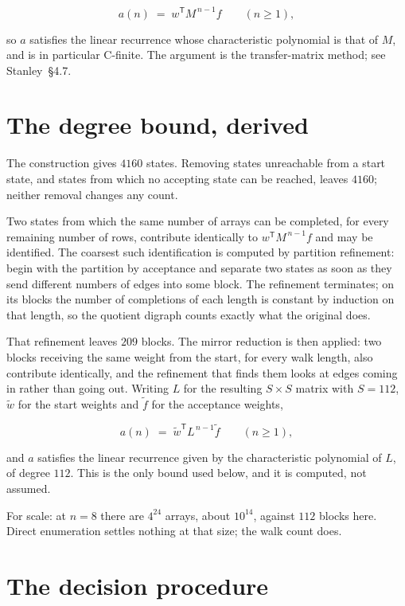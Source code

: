 \documentclass[11pt]{article}
\theoremstyle{definition}
\begin{document}
\[a(n) \;=\; w^{\mathsf T} M^{\,n-1} f \qquad (n \ge 1),\]

so $a$ satisfies the linear recurrence whose characteristic polynomial is that of $M$, and is in particular C-finite. The argument is the transfer-matrix method; see Stanley~\S4.7.

\section{The degree bound, derived}

The construction gives $4160$ states. Removing states unreachable from a start state, and states from which no accepting state can be reached, leaves $4160$; neither removal changes any count.

Two states from which the same number of arrays can be completed, for every remaining number of rows, contribute identically to $w^{\mathsf T}M^{\,n-1}f$ and may be identified. The coarsest such identification is computed by partition refinement: begin with the partition by acceptance and separate two states as soon as they send different numbers of edges into some block. The refinement terminates; on its blocks the number of completions of each length is constant by induction on that length, so the quotient digraph counts exactly what the original does.

That refinement leaves $209$ blocks. The mirror reduction is then applied: two blocks receiving the same weight from the start, for every walk length, also contribute identically, and the refinement that finds them looks at edges coming in rather than going out. Writing $L$ for the resulting $S \times S$ matrix with $S = 112$, $\tilde w$ for the start weights and $\tilde f$ for the acceptance weights,

\[a(n) \;=\; \tilde w^{\mathsf T} L^{\,n-1} \tilde f \qquad (n \ge 1),\]

and $a$ satisfies the linear recurrence given by the characteristic polynomial of $L$, of degree $112$. This is the only bound used below, and it is computed, not assumed.

For scale: at $n = 8$ there are $4^{24}$ arrays, about $10^{14}$, against $112$ blocks here. Direct enumeration settles nothing at that size; the walk count does.

\section{The decision procedure}
\end{document}
